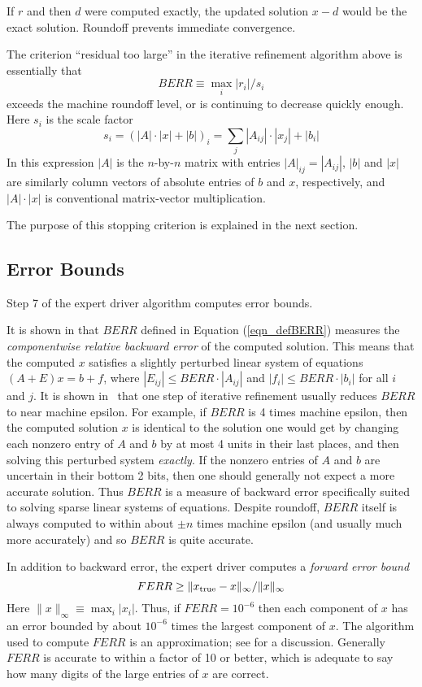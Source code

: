 If $r$ and then $d$ were computed exactly, the updated solution $x-d$ would
be the exact solution. Roundoff prevents immediate convergence. 

The criterion ``residual too large'' in the iterative refinement algorithm
above is essentially that 
\begin{equation}\label{eqn_defBERR}
BERR \equiv \max_i |r_i|/s_i
\end{equation}
exceeds the machine roundoff level, or is continuing to
decrease quickly enough. Here $s_i$ is the scale factor 
\[
s_i = (|A| \cdot |x| + |b|)_i = \sum_j |A_{ij}| \cdot |x_j| + |b_i|
\]
In this expression $|A|$ is the $n$-by-$n$ matrix with entries
$|A|_{ij} = |A_{ij}|$, $|b|$ and $|x|$ are similarly column vectors of
absolute entries of $b$ and $x$, respectively, 
and $|A| \cdot |x|$ is conventional matrix-vector multiplication.

The purpose of this stopping criterion is explained in the next section.

\subsection{Error Bounds}

Step 7 of the expert driver algorithm computes error bounds.

It is shown in 
\cite{arioli89,oettliprager} that $BERR$ defined 
in Equation (\ref{eqn_defBERR})
measures the 
{\em componentwise relative backward error} of the computed solution.
This means that the computed $x$ satisfies a slightly perturbed
linear system of equations $(A+E)x=b+f$, where
$|E_{ij}| \leq BERR \cdot |A_{ij}|$ and
$|f_{i}| \leq BERR \cdot |b_{i}|$ for all $i$ and $j$.
It is shown in~\cite{arioli89,skeel80} that one step of iterative
refinement usually reduces $BERR$ to near machine epsilon.
For example, if $BERR$ is 4 times machine epsilon, then
the computed solution $x$ is identical to the
solution one would get by changing each nonzero entry of $A$ and $b$
by at most 4 units in their last places, and then solving this perturbed
system {\em exactly}. If the nonzero entries of $A$ and $b$ are uncertain
in their bottom 2 bits, then one should generally not expect a more 
accurate solution.
Thus $BERR$ is a measure of backward error specifically suited to
solving sparse linear systems of equations. Despite roundoff, $BERR$ itself
is always computed to within about $\pm n$ times machine epsilon
(and usually much more accurately) and so $BERR$ is quite accurate.

In addition to backward error, the expert driver computes a 
{\em forward error bound} 
\[
FERR \geq \|x_{\rm true} - x \|_{\infty} / \| x \|_{\infty}
\]
Here $\|x\|_{\infty} \equiv \max_i |x_i|$. Thus, if $FERR = 10^{-6}$ then
each component of $x$ has an error bounded by about $10^{-6}$ times the
largest component of $x$. The algorithm used to compute $FERR$ is an
approximation; see \cite{arioli89,higham96} for a discussion.
Generally $FERR$ is accurate to within a factor of 10 or better, 
which is adequate to say how many digits of the large entries of $x$ 
are correct.

